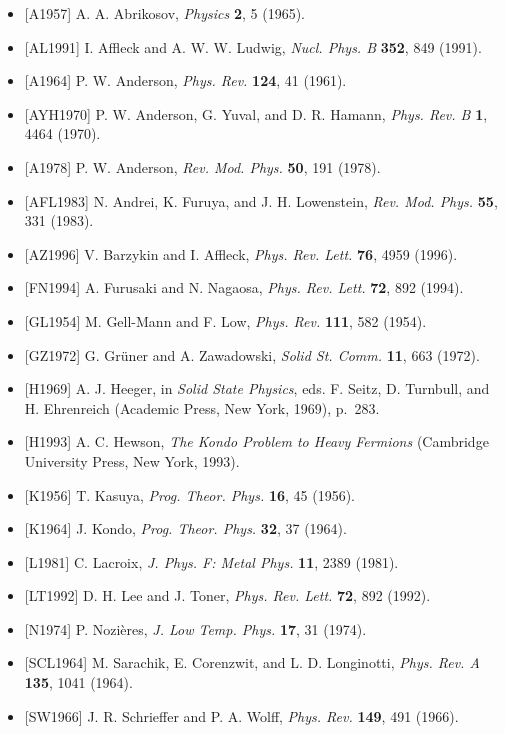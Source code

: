 \begin{itemize}[leftmargin=2em,itemsep=0pt,parsep=0pt,label={}]
\item {[A1957]} A. A. Abrikosov, \emph{Physics} \textbf{2}, 5 (1965).
\item {[AL1991]} I. Affleck and A. W. W. Ludwig, \emph{Nucl. Phys. B} \textbf{352}, 849 (1991).
\item {[A1964]} P. W. Anderson, \emph{Phys. Rev.} \textbf{124}, 41 (1961).
\item {[AYH1970]} P. W. Anderson, G. Yuval, and D. R. Hamann, \emph{Phys. Rev. B} \textbf{1}, 4464 (1970).
\item {[A1978]} P. W. Anderson, \emph{Rev. Mod. Phys.} \textbf{50}, 191 (1978).
\item {[AFL1983]} N. Andrei, K. Furuya, and J. H. Lowenstein, \emph{Rev. Mod. Phys.} \textbf{55}, 331 (1983).
\item {[AZ1996]} V. Barzykin and I. Affleck, \emph{Phys. Rev. Lett.} \textbf{76}, 4959 (1996).
\item {[FN1994]} A. Furusaki and N. Nagaosa, \emph{Phys. Rev. Lett.} \textbf{72}, 892 (1994).
\item {[GL1954]} M. Gell-Mann and F. Low, \emph{Phys. Rev.} \textbf{111}, 582 (1954).
\item {[GZ1972]} G. Gr\"{u}ner and A. Zawadowski, \emph{Solid St. Comm.} \textbf{11}, 663 (1972).
\item {[H1969]} A. J. Heeger, in \emph{Solid State Physics}, eds. F. Seitz, D. Turnbull, and H. Ehrenreich (Academic Press, New York, 1969), p.~283.
\item {[H1993]} A. C. Hewson, \emph{The Kondo Problem to Heavy Fermions} (Cambridge University Press, New York, 1993).
\item {[K1956]} T. Kasuya, \emph{Prog. Theor. Phys.} \textbf{16}, 45 (1956).
\item {[K1964]} J. Kondo, \emph{Prog. Theor. Phys.} \textbf{32}, 37 (1964).
\item {[L1981]} C. Lacroix, \emph{J. Phys. F: Metal Phys.} \textbf{11}, 2389 (1981).
\item {[LT1992]} D. H. Lee and J. Toner, \emph{Phys. Rev. Lett.} \textbf{72}, 892 (1992).
\item {[N1974]} P. Nozi\`{e}res, \emph{J. Low Temp. Phys.} \textbf{17}, 31 (1974).
\item {[SCL1964]} M. Sarachik, E. Corenzwit, and L. D. Longinotti, \emph{Phys. Rev. A} \textbf{135}, 1041 (1964).
\item {[SW1966]} J. R. Schrieffer and P. A. Wolff, \emph{Phys. Rev.} \textbf{149}, 491 (1966).

\end{itemize}
